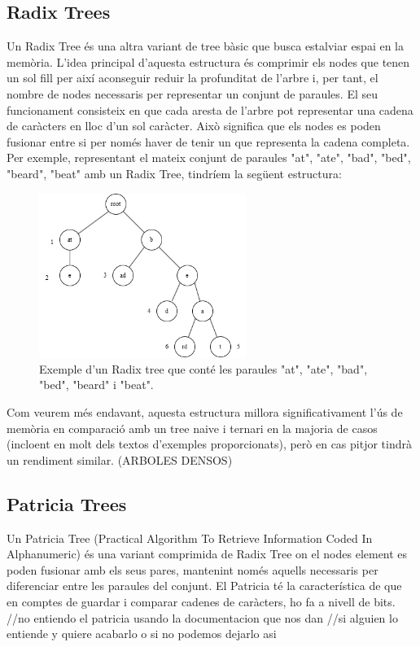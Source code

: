 \subsection{Radix Trees}
Un Radix Tree és una altra variant de tree bàsic que busca estalviar espai en la memòria. L'idea principal d'aquesta estructura és comprimir els nodes que tenen un sol fill per així aconseguir reduir la profunditat de l'arbre i, per tant, el nombre de nodes necessaris per representar un conjunt de paraules.
El seu funcionament consisteix en que cada aresta de l'arbre pot representar una cadena de caràcters en lloc d'un sol caràcter. Això significa que els nodes es poden fusionar entre si per només haver de tenir un que representa la cadena completa. Per exemple, representant el mateix conjunt de paraules {"at", "ate", "bad", "bed", "beard", "beat"} amb un Radix Tree, tindríem la següent estructura:
\begin{figure}[H]
    \centering
    \includegraphics[width=0.6\textwidth]{figures/radix_example.png}
    \caption{Exemple d'un Radix tree que conté les paraules "at", "ate", "bad", "bed", "beard" i "beat".}
    \label{fig:radix_example}
\end{figure}
Com veurem més endavant, aquesta estructura millora significativament l'ús de memòria en comparació amb un tree naive i ternari en la majoria de casos (incloent en molt dels textos d'exemples proporcionats), però en cas pitjor tindrà un rendiment similar. (ARBOLES DENSOS)

\subsection{Patricia Trees}
Un Patricia Tree (Practical Algorithm To Retrieve Information Coded In Alphanumeric) és una variant comprimida de Radix Tree on el nodes element es poden fusionar amb els seus pares, mantenint només aquells necessaris per diferenciar entre les paraules del conjunt.
El Patricia té la característica de que en comptes de guardar i comparar cadenes de caràcters, ho fa a nivell de bits.
//no entiendo el patricia usando la documentacion que nos dan
//si alguien lo entiende y quiere acabarlo o si no podemos dejarlo asi

